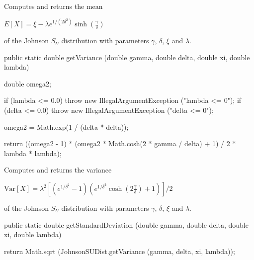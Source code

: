\begin{tabb}  Computes and returns the mean
\begin{latexonly}
   $E[X] = \xi - \lambda e^{1/(2\delta^2)} \sinh(\frac{\gamma}{\delta})$
\end{latexonly}
   of the Johnson $S_U$ distribution with parameters $\gamma$, $\delta$, $\xi$ and $\lambda$.
\end{tabb}
\begin{htmlonly}
\end{htmlonly}
\begin{code}

   public static double getVariance (double gamma, double delta,
                                     double xi, double lambda)\begin{hide} {
      double omega2;

      if (lambda <= 0.0)
         throw new IllegalArgumentException ("lambda <= 0");
      if (delta <= 0.0)
         throw new IllegalArgumentException ("delta <= 0");

      omega2 = Math.exp(1 / (delta * delta));

      return ((omega2 - 1) * (omega2 * Math.cosh(2 * gamma / delta) + 1) / 2 * lambda * lambda);
   }\end{hide}
\end{code}
\begin{tabb}  Computes and returns the variance
\begin{latexonly}
    $\mbox{Var}[X] = \lambda^2 [(e^{1/\delta^2} - 1)(e^{1/\delta^2}
                     \cosh(2 \frac{\gamma}{\delta}) + 1)]/2$
\end{latexonly}
   of the Johnson $S_U$ distribution with parameters $\gamma$, $\delta$, $\xi$ and $\lambda$.
\end{tabb}
\begin{htmlonly}
\end{htmlonly}
\begin{code}

   public static double getStandardDeviation (double gamma, double delta,
                                              double xi, double lambda)\begin{hide} {
      return Math.sqrt (JohnsonSUDist.getVariance (gamma, delta, xi, lambda));
   }\end{hide}
\end{code}
